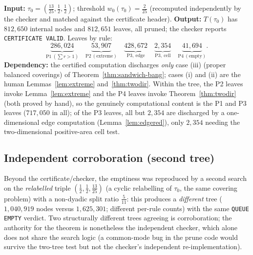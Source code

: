 \noindent\textbf{Input:} $\tau_0=(\tfrac{13}{25},\tfrac12,\tfrac12)$; threshold
$w_0(\tau_0)=\tfrac2{25}$ (recomputed independently by the checker and matched
against the certificate header). \textbf{Output:} $T(\tau_0)$ has $812{,}650$
internal nodes and $812{,}651$ leaves, all pruned; the checker reports
\texttt{CERTIFICATE VALID}. Leaves by rule:
\[
\underbrace{286{,}024}_{\mathrm{P1}\ (\sum r>1)}\quad
\underbrace{53{,}907}_{\mathrm{P2}\ (\text{extreme})}\quad
\underbrace{428{,}672}_{\mathrm{P3,\ edge}}\quad
\underbrace{2{,}354}_{\mathrm{P3,\ cell}}\quad
\underbrace{41{,}694}_{\mathrm{P4}\ (\text{empty})}.
\]
\textbf{Dependency:} the certified computation discharges \emph{only} case
(iii) (proper balanced coverings) of Theorem~\ref{thm:sandwich-bang}; cases (i)
and (ii) are the human Lemmas~\ref{lem:extreme} and~\ref{thm:twodir}. Within the
tree, the P2 leaves invoke Lemma~\ref{lem:extreme} and the P4 leaves invoke
Theorem~\ref{thm:twodir} (both proved by hand), so the genuinely computational
content is the P1 and P3 leaves ($717{,}050$ in all); of the P3 leaves, all but
$2{,}354$ are discharged by a one-dimensional edge computation
(Lemma~\ref{lem:edgered}), only $2{,}354$ needing the two-dimensional
positive-area cell test.

\subsection*{Independent corroboration (second tree)}

Beyond the certificate/checker, the emptiness was reproduced by a second search
on the \emph{relabelled} triple $(\tfrac12,\tfrac12,\tfrac{13}{25})$ (a cyclic
relabelling of $\tau_0$, the same covering problem) with a non-dyadic split
ratio $\tfrac5{11}$: this produces a \emph{different} tree ($1{,}040{,}919$
nodes versus $1{,}625{,}301$; different per-rule counts) with the same
\texttt{QUEUE EMPTY} verdict. Two structurally different trees agreeing is
corroboration; the authority for the theorem is nonetheless the independent
checker, which alone does not share the search logic (a common-mode bug in the
prune code would survive the two-tree test but not the checker's independent
re-implementation).
